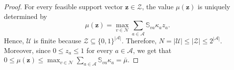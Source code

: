 \documentclass[10pt,a4paper]{amsart}
\begin{document}
\begin{proof}
For every feasible support vector $\mathbf z\in\mathcal Z$, the value
$\mu(\mathbf z)$ is uniquely determined by
$$
\mu(\mathbf z)=
\max_{v\in\mathcal N}
\sum_{a\in\mathcal A}
\mathbb S_{va}\kappa_a z_a.
$$
Hence, $\mathcal U$ is finite because $\mathcal Z\subseteq\{0,1\}^{|\mathcal A|}$. Therefore,
$N=|\mathcal U|
\le
|\mathcal Z|
\le
2^{|\mathcal A|}$. 
Moreover, since $0\le z_a\le1$ for every $a\in\mathcal A$, we get that $
0
\le
\mu(\mathbf z)
\le
\max_{v\in\mathcal N}
\sum_{a\in\mathcal A}
\mathbb S_{va}\kappa_a
=
\bar\mu$.
\end{proof}
\end{document}
